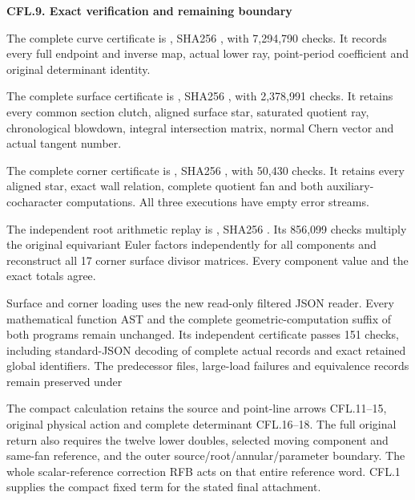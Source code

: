 \par

\medskip\noindent\textbf{CFL.9. Exact verification and remaining boundary}

\par\nobreak

The complete curve certificate is
,
SHA256
,
with 7,294,790 checks. It records every full endpoint
and inverse map, actual lower ray, point-period
coefficient and original determinant identity.

The complete surface certificate is
,
SHA256
,
with 2,378,991 checks. It retains every common section
clutch, aligned surface star, saturated quotient ray,
chronological blowdown, integral intersection matrix,
normal Chern vector and actual tangent number.

The complete corner certificate is
,
SHA256
,
with 50,430 checks. It retains every aligned star,
exact wall relation, complete quotient fan and both
auxiliary-cocharacter computations. All three
executions have empty error streams.

The independent root arithmetic replay is
,
SHA256
.
Its 856,099 checks multiply the original equivariant
Euler factors independently for all components and
reconstruct all 17 corner surface divisor matrices.
Every component value and the exact totals agree.

Surface and corner loading uses the new read-only
filtered JSON reader. Every mathematical function AST
and the complete geometric-computation suffix of both
programs remain unchanged. Its independent certificate
passes 151 checks, including standard-JSON decoding
of complete actual records and exact retained global
identifiers. The predecessor files, large-load failures
and equivalence records remain preserved under

The compact calculation retains the source and point-line
arrows CFL.11--15, original physical action and complete
determinant CFL.16--18. The full original return also
requires the twelve lower doubles, selected moving
component and same-fan reference, and the outer
source/root/annular/parameter boundary. The whole
scalar-reference correction RFB acts on that entire
reference word. CFL.1 supplies the compact fixed term
for the stated final attachment.

